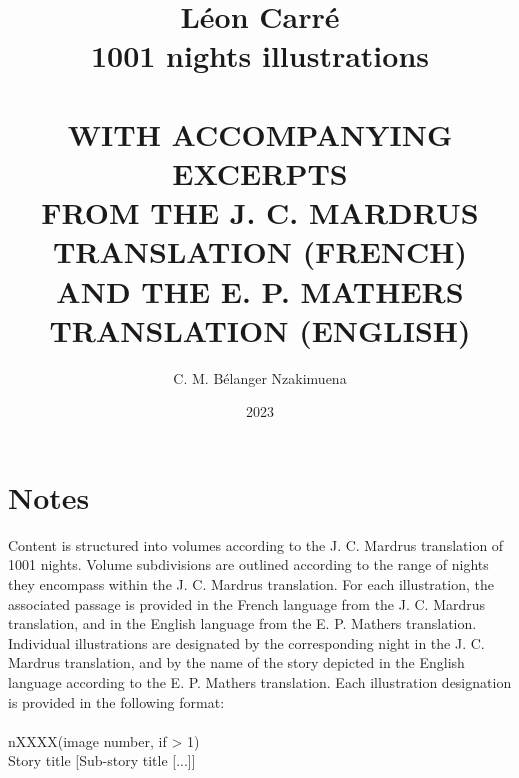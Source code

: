 \documentclass[a4paper,12pt,]{book}
\newcommand\tab[1][1cm]{\hspace*{#1}}
\begin{document}
\title{ 
\Huge{\textbf{Léon Carré \protect\\ 1001 nights illustrations}} \\~\\
\small{\uppercase{with accompanying excerpts \protect\\ from the J. C. Mardrus translation (French) \protect\\ and the E. P. Mathers translation (English)}}
} %
\author{C. M. Bélanger Nzakimuena}
\date{2023} %
\maketitle

\setlength\parindent{0pt} %
\let\cleardoublepage\clearpage %

\frontmatter
\tableofcontents %

\chapter*{Notes}
Content is structured into volumes according to the J. C. Mardrus translation of 1001 nights.  Volume subdivisions are outlined according to the range of nights they encompass within the J. C. Mardrus translation.  For each illustration, the associated passage is provided in the French language from the J. C. Mardrus translation, and in the English language from the E. P. Mathers translation.  Individual illustrations are designated by the corresponding night in the J. C. Mardrus translation, and by the name of the story depicted in the English language according to the E. P. Mathers translation.  Each illustration designation is provided in the following format: \\~\\
\tab\tab\tab\tab nXXXX(\textquotesingle image number\textquotesingle, if > 1)\\
\tab\tab\tab\tab Story title [Sub-story title [...]]

\mainmatter
\end{document}
